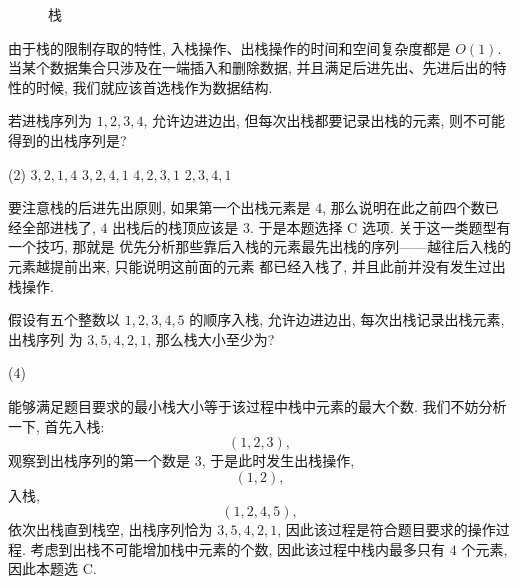 \documentclass[10pt,UTF8]{book} %
\begin{document}
\begin{figure}[H]

    \caption{栈}
    \label{栈}
\end{figure}

由于栈的限制存取的特性, 入栈操作、出栈操作的时间和空间复杂度都是 $O(1)$.
当某个数据集合只涉及在一端插入和删除数据, 并且满足后进先出、先进后出的特性的时候,
我们就应该首选栈作为数据结构.

\begin{example}
    若进栈序列为 $1,2,3,4$, 允许边进边出, 但每次出栈都要记录出栈的元素, 则不可能得到的出栈序列是?
    \begin{tasks}[label={\Alph*.}](2)
        \task $3,2,1,4$
        \task $3,2,4,1$
        \task $4,2,3,1$
        \task $2,3,4,1$
    \end{tasks}
    \begin{cmt}
        要注意栈的后进先出原则, 如果第一个出栈元素是 $4$, 那么说明在此之前四个数已经全部进栈了,
        $4$ 出栈后的栈顶应该是 $3$. 于是本题选择 C 选项. 关于这一类题型有一个技巧, 那就是
        优先分析那些{\kaishu 靠后入栈的元素最先出栈}的序列——越往后入栈的元素越提前出来, 只能说明这前面的元素
        都已经入栈了, 并且此前并没有发生过出栈操作.
    \end{cmt}
\end{example}

\begin{example}
    假设有五个整数以 $1,2,3,4,5$ 的顺序入栈, 允许边进边出, 每次出栈记录出栈元素, 出栈序列
    为 $3,5,4,2,1$, 那么栈大小至少为?
    \begin{tasks}[label={\Alph*.}](4)
    \end{tasks}
    \begin{cmt}
        能够满足题目要求的最小栈大小等于该过程中栈中元素的最大个数. 我们不妨分析一下,
        首先入栈: \[ (1,2,3), \]
        观察到出栈序列的第一个数是 $3$, 于是此时发生出栈操作,
        \[ (1,2), \]
        入栈, \[ (1,2,4,5), \]
        依次出栈直到栈空, 出栈序列恰为 $3,5,4,2,1$, 因此该过程是符合题目要求的操作过程.
        考虑到出栈不可能增加栈中元素的个数,
        因此该过程中栈内最多只有 $4$ 个元素, 因此本题选 C.
    \end{cmt}
\end{example}
\end{document}

